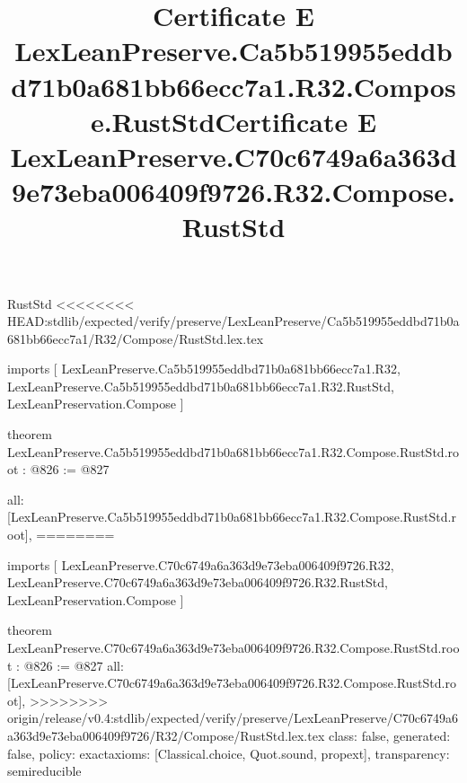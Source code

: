 \begin{lexlean}{RustStd}
<<<<<<<< HEAD:stdlib/expected/verify/preserve/LexLeanPreserve/Ca5b519955eddbd71b0a681bb66ecc7a1/R32/Compose/RustStd.lex.tex
\title{Certificate E LexLeanPreserve.Ca5b519955eddbd71b0a681bb66ecc7a1.R32.Compose.RustStd}
\begin{coremodule}
imports [
  LexLeanPreserve.Ca5b519955eddbd71b0a681bb66ecc7a1.R32,
  LexLeanPreserve.Ca5b519955eddbd71b0a681bb66ecc7a1.R32.RustStd,
  LexLeanPreservation.Compose
]

theorem LexLeanPreserve.Ca5b519955eddbd71b0a681bb66ecc7a1.R32.Compose.RustStd.root : @826 := @827 {
  all: [LexLeanPreserve.Ca5b519955eddbd71b0a681bb66ecc7a1.R32.Compose.RustStd.root],
========
\title{Certificate E LexLeanPreserve.C70c6749a6a363d9e73eba006409f9726.R32.Compose.RustStd}
\begin{coremodule}
imports [
  LexLeanPreserve.C70c6749a6a363d9e73eba006409f9726.R32,
  LexLeanPreserve.C70c6749a6a363d9e73eba006409f9726.R32.RustStd,
  LexLeanPreservation.Compose
]

theorem LexLeanPreserve.C70c6749a6a363d9e73eba006409f9726.R32.Compose.RustStd.root : @826 := @827 {
  all: [LexLeanPreserve.C70c6749a6a363d9e73eba006409f9726.R32.Compose.RustStd.root],
>>>>>>>> origin/release/v0.4:stdlib/expected/verify/preserve/LexLeanPreserve/C70c6749a6a363d9e73eba006409f9726/R32/Compose/RustStd.lex.tex
  class: false,
  generated: false,
  policy: exact{axioms: [Classical.choice, Quot.sound, propext]},
  transparency: semireducible
}


\end{coremodule}}
\end{coremodule}
\end{lexlean}
